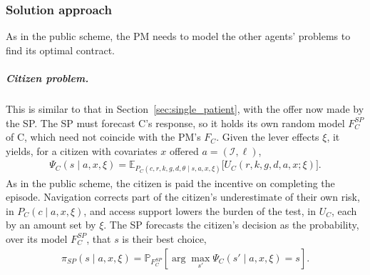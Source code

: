 \documentclass[12pt]{article}
\begin{document}
\subsubsection{Solution approach}\label{sec:OBP_inc}
As in the public scheme, the PM needs to model the other agents' problems to find its optimal contract. 
\subparagraph{Citizen problem.}
This is similar to that in Section~\ref{sec:single_patient}, with the offer now made by the SP. The SP must forecast C's response, so it holds its own random model $F_C^{SP}$ of C, which need not coincide with the PM's $F_C$. Given the lever effects $\xi$, it yields, for a citizen with covariates $x$ offered
$a = (\mathcal{I}, \ell)$,
\begin{align} \label{eq:psi_C}
    \Psi_C(s \mid a, x, \xi) = \mathbb{E}_{P_C(c, r, k, g, d, \theta \mid s, a, x, \xi)} \big[ U_C( r, k, g, d, a, x; \xi ) \big].
\end{align}
As in the public scheme, the citizen is paid the incentive on completing the episode. Navigation corrects part of the citizen's underestimate of their own risk, in $P_C(c \mid a, x, \xi)$, and access support lowers the burden of the test, in $U_C$, each by an amount set by $\xi$. The SP forecasts the citizen's decision as the probability, over its model $F_C^{SP}$, that $s$ is their best choice,
\begin{align} \label{eq:p_s}
    \pi_{SP}(s \mid a, x, \xi) = \mathbb{P}_{F_C^{SP}}\!\left[
    \arg\max_{s'} \Psi_C(s' \mid a, x, \xi) = s \right].
\end{align}
\end{document}
